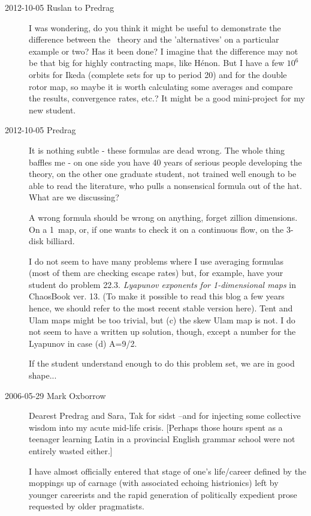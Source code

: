\begin{description}
\item[2012-10-05 Ruslan to Predrag]
I was wondering, do you think it might be useful to demonstrate the
difference between the \po\ theory and the 'alternatives' on a particular
example or two?  Has it been done?  I imagine that the difference may not
be that big for highly contracting maps, like H\'enon.  But I have a few
$10^6$ orbits for Ikeda (complete sets for up to period 20) and for the
double rotor map, so maybe it is worth calculating some averages and
compare the results, convergence rates, etc.?  It might be a good
mini-project for my new student.

\item[2012-10-05 Predrag] It is nothing subtle - these formulas are dead
wrong. The whole thing baffles me - on one side you have 40 years of
serious people developing the theory, on the other one graduate student,
not trained well enough to be able to read the literature,  who pulls
a nonsensical formula out of the hat. What are we discussing?

A wrong formula should be wrong on anything, forget zillion dimensions.
On a 1\dmn\ map, or, if one wants to check it on a continuous flow, on
the 3-disk billiard.

I do not seem to have many problems where I use averaging formulas (most
of them are checking escape rates) but, for example, have your student do
problem 22.3. \emph{Lyapunov exponents for 1-dimensional maps} in
 {ChaosBook
ver. 13}. (To make it possible to read this blog a few years hence, we
should refer to the most recent stable version here). Tent and Ulam maps
might be too trivial, but (c) the skew Ulam map is not. I do not seem to
have a written up solution, though, except a number for the Lyapunov in
case (d) A=9/2.

If the student understand enough to do this problem set, we are in good
shape...


\item[2006-05-29 Mark Oxborrow]
Dearest Predrag and Sara, Tak for sidst --and for injecting some
collective wisdom into my acute mid-life crisis. [Perhaps those hours
spent as a teenager learning Latin in a provincial English grammar school
were not entirely wasted either.]

I have almost officially entered that stage of one's life/career defined
by the moppings up of carnage (with associated echoing histrionics) left
by younger careerists and the rapid generation of politically expedient
prose requested by older pragmatists.


\end{description}
